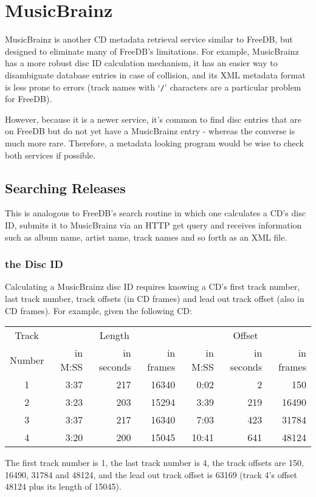 
\chapter{MusicBrainz}
MusicBrainz is another CD metadata retrieval service similar to FreeDB,
but designed to eliminate many of FreeDB's limitations.
For example, MusicBrainz has a more robust disc ID calculation mechanism,
it has an easier way to disambiguate database entries in case of collision,
and its XML metadata format is less prone to errors
(track names with `\texttt{/}' characters are a particular problem for
FreeDB).

However, because it is a newer service, it's common to find disc entries
that are on FreeDB but do not yet have a MusicBrainz entry - whereas
the converse is much more rare.
Therefore, a metadata looking program would be wise to check both
services if possible.

\section{Searching Releases}
This is analogous to FreeDB's search routine in which one calculates
a CD's disc ID, submits it to MusicBrainz via an HTTP get query
and receives information such as album name, artist name, track names
and so forth as an XML file.

\pagebreak

\subsection{the Disc ID}
Calculating a MusicBrainz disc ID requires knowing a CD's first track number,
last track number, track offsets (in CD frames) and lead out track offset
(also in CD frames).
For example, given the following CD:
\begin{table}[h]
\begin{tabular}{|c||r|r|r||r|r|r|}
\hline
Track & \multicolumn{3}{c||}{Length} & \multicolumn{3}{c|}{Offset} \\
Number & in M:SS & in seconds & in frames & in M:SS & in seconds & in frames \\
\hline
1 & 3:37 & 217 & 16340 & 0:02 & 2 & 150 \\
2 & 3:23 & 203 & 15294 & 3:39 & 219 & 16490 \\
3 & 3:37 & 217 & 16340 & 7:03 & 423 & 31784 \\
4 & 3:20 & 200 & 15045 & 10:41 & 641 & 48124 \\
\hline
\end{tabular}
\end{table}
\par
\noindent
The first track number is 1, the last track number is 4, the track offsets
are 150, 16490, 31784 and 48124, and the lead out track offset is
63169 (track 4's offset 48124 plus its length of 15045).

